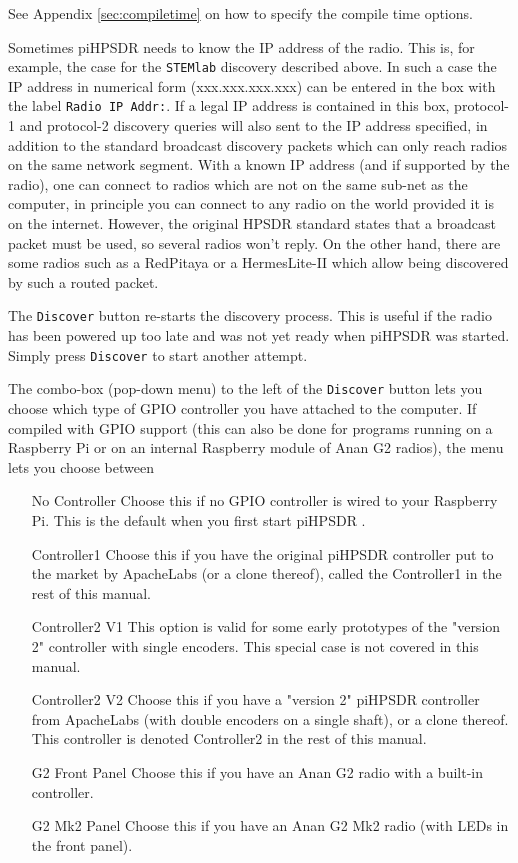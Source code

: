 \documentclass[12pt]{book}
\def\rett#1{\texttt{\color{red}#1}}
\def\pH{pi\-HPSDR }
\begin{document}
See Appendix \ref{sec:compiletime} on how to specify the compile time options.

Sometimes \pH needs to know the IP address of the radio. This is, for example, the case for the
\texttt{STEMlab} discovery
described above. In such a case the IP address in numerical form (xxx.xxx.xxx.xxx) can be entered in the box
with the label \rett{Radio IP Addr:}. If a legal IP address is contained in this box, protocol-1 and
protocol-2 discovery queries
will also sent to the IP address specified, in addition to the standard broadcast discovery packets which
can only reach
radios on the same network segment. With a known IP address (and if supported by the radio),  one can
connect to radios which are not on the same sub-net as the computer, in principle you can connect to any
radio on the world
provided it is on the internet. However, the original HPSDR standard states that a broadcast packet must be
used, so several
radios won't reply. On the other hand, there are some radios such as a RedPitaya or a HermesLite-II which
allow being discovered by such a routed packet.

The \rett{Discover} button re-starts the discovery process. This is useful if the radio has been powered up
too late and
was not yet ready when \pH was started. Simply press \rett{Discover} to start another attempt.

The combo-box (pop-down menu) to the left of the \rett{Discover} button lets you choose which type of GPIO
controller you
have attached to the computer.  If compiled with GPIO support (this can also be done for
programs running on a Raspberry Pi or on an internal Raspberry module of Anan G2 radios),
the menu lets you choose between

\begin{itemize}[font=\texttt, left=80pt]
\item[No Controller]{Choose this if no GPIO controller is wired to your Raspberry Pi. This is the default
when you first start \pH.}
\item[Controller1]{Choose this if you have the original \pH controller put to the market by ApacheLabs
(or a clone thereof), called the Controller1 in the rest
of this manual.}
\item[Controller2 V1]{This option is valid for some early prototypes of the "version 2" controller with
single encoders. This special case is not covered in this manual.}
\item[Controller2 V2]{Choose this if you have a "version 2" \pH controller from ApacheLabs (with double encoders
on a single shaft), or a clone thereof.
This controller is denoted Controller2 in the rest of this manual.}
\item[G2 Front Panel]{Choose this if you have an Anan G2 radio with a built-in controller.}
\item[G2 Mk2 Panel]{Choose this if you have an Anan G2 Mk2 radio (with LEDs in the front panel).}
\end{itemize}
\end{document}

